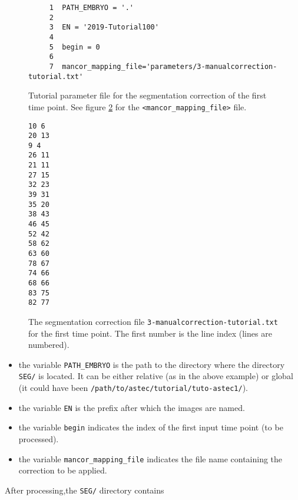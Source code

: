 \begin{figure}
\begin{framed}
\begin{verbatim}
     1	PATH_EMBRYO = '.'
     2	
     3	EN = '2019-Tutorial100'
     4	
     5	begin = 0
     6	
     7	mancor_mapping_file='parameters/3-manualcorrection-tutorial.txt'
\end{verbatim}
\end{framed}
\caption{\label{fig:tutorial:parameter:manual:correction} Tutorial
  parameter file for the segmentation correction of the first time
  point. See figure
  \protect\ref{fig:tutorial:parameter:manual:correction:file} for the
  \texttt{<mancor\_mapping\_file>} file.}
\end{figure}

\begin{figure}
\begin{framed}
\begin{verbatim}
10 6
20 13
9 4
26 11
21 11
27 15
32 23
39 31
35 20
38 43
46 45
52 42
58 62
63 60
78 67
74 66
68 66
83 75
82 77
\end{verbatim}
\end{framed}
\caption{\label{fig:tutorial:parameter:manual:correction:file}
  The segmentation correction file
  \texttt{3-manualcorrection-tutorial.txt} for the first time point. The first
  number is the line index (lines are numbered).}
\end{figure}

\begin{itemize}
  \itemsep -1ex
  \item the variable \texttt{PATH\_EMBRYO} is the path to the directory where
    the directory \texttt{SEG/} is located. It can be either relative (as in the
    above example) or
    global (it could have been \texttt{/path/to/astec/tutorial/tuto-astec1/}).
  \item the variable \texttt{EN} is the prefix after which the  images
    are named. 
  \item the variable \texttt{begin} indicates  the
    index of the first input time point (to be processed).
  \item the variable \texttt{mancor\_mapping\_file} indicates the file
    name containing the correction to be applied.
\end{itemize}

After processing,the \texttt{SEG/} directory contains

\mbox{}
\mbox{}

